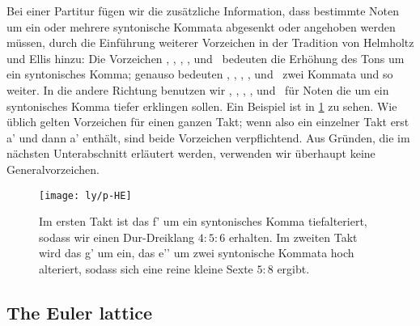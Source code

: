 \documentclass[british,11pt]{scrartcl}
\begin{document}
Bei einer Partitur fügen wir die zusätzliche Information, dass bestimmte Noten
um ein oder mehrere syntonische Kommata abgesenkt oder angehoben werden müssen,
durch die Einführung weiterer Vorzeichen in der Tradition von Helmholtz und
Ellis \cite{HE} hinzu: Die Vorzeichen \dsharpp, \sharpp, \naturalp, \flatp, und
\dflatp\ bedeuten die Erhöhung des Tons um ein syntonisches Komma; genauso
bedeuten \dsharpp, \sharppp, \naturalpp, \flatpp, und \dflatpp\ zwei Kommata und
so weiter. In die andere Richtung benutzen wir \dsharpm, \sharpm, \naturalm,
\flatm, und \dflatm\ für Noten die um ein syntonisches Komma tiefer erklingen
sollen. Ein Beispiel ist in \cref{fig:HE} zu sehen. Wie üblich gelten Vorzeichen
für einen ganzen Takt; wenn also ein einzelner Takt erst \naturalm a' und dann
\natural a' enthält, sind beide Vorzeichen verpflichtend. Aus Gründen, die im
nächsten Unterabschnitt erläutert werden, verwenden wir überhaupt keine
Generalvorzeichen.

\begin{figure}\centering
  \texttt{[image: ly/p-HE]}
  \caption{Im ersten Takt ist das \sharp f’ um ein syntonisches Komma 
    tiefalteriert, sodass wir einen Dur-Dreiklang $4:5:6$ erhalten. Im zweiten
    Takt wird das g’ um ein, das \flat e’’ um zwei syntonische Kommata hoch
    alteriert, sodass sich eine reine kleine Sexte $5:8$ ergibt.}\label{fig:HE}
\end{figure}

\subsection{The Euler lattice}
\end{document}

